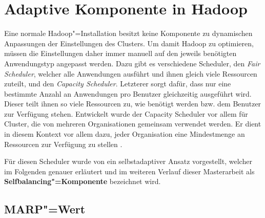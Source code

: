 \section{Adaptive Komponente in Hadoop}
\label{sec:inriaSetting}

Eine normale Hadoop"=Installation besitzt keine Komponente zu dynamischen Anpassungen der Einstellungen des Clusters.
Um damit Hadoop zu optimieren, müssen die Einstellungen daher immer manuell auf den jeweils benötigten Anwendungstyp angepasst werden.
Dazu gibt es \uA verschiedene Scheduler, den \emph{Fair Scheduler}, welcher alle Anwendungen ausführt und ihnen gleich viele Ressourcen zuteilt, und den \emph{Capacity Scheduler}.
Letzterer sorgt dafür, dass nur eine bestimmte Anzahl an Anwendungen pro Benutzer gleichzeitig ausgeführt wird.
Dieser teilt ihnen so viele Ressourcen zu, wie benötigt werden bzw. dem Benutzer zur Verfügung stehen.
Entwickelt wurde der Capacity Scheduler vor allem für Cluster, die von mehreren Organisationen gemeinsam verwendet werden.
Er dient in diesem Kontext vor allem dazu, jeder Organisation eine Mindestmenge an Ressourcen zur Verfügung zu stellen \cite{HadoopCapScheduler271}.

Für diesen Scheduler wurde von \citeauthor{Zhang2016} \cite{Zhang2016} ein selbstadaptiver Ansatz vorgestellt, welcher im Folgenden genauer erläutert und im weiteren Verlauf dieser Masterarbeit als \textbf{Selfbalancing"=Komponente} bezeichnet wird.

\subsection{MARP"=Wert}
\label{subsec:selfbalancingMarp}

